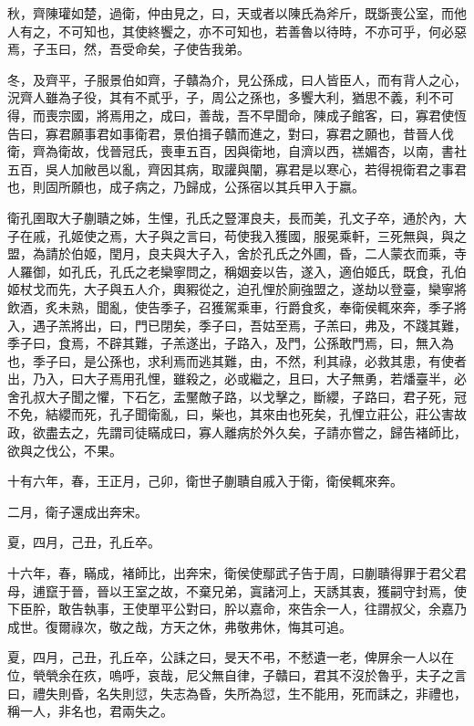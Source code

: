 \begin{pinyinscope}
秋，齊陳瓘如楚，過衛，仲由見之，曰，天或者以陳氏為斧斤，既斲喪公室，而他人有之，不可知也，其使終饗之，亦不可知也，若善魯以待時，不亦可乎，何必惡焉，子玉曰，然，吾受命矣，子使告我弟。

冬，及齊平，子服景伯如齊，子贛為介，見公孫成，曰人皆臣人，而有背人之心，況齊人雖為子役，其有不貳乎，子，周公之孫也，多饗大利，猶思不義，利不可得，而喪宗國，將焉用之，成曰，善哉，吾不早聞命，陳成子館客，曰，寡君使恆告曰，寡君願事君如事衛君，景伯揖子贛而進之，對曰，寡君之願也，昔晉人伐衛，齊為衛故，伐晉冠氏，喪車五百，因與衛地，自濟以西，禚媚杏，以南，書社五百，吳人加敝邑以亂，齊因其病，取讙與闡，寡君是以寒心，若得視衛君之事君也，則固所願也，成子病之，乃歸成，公孫宿以其兵甲入于嬴。

衛孔圉取大子蒯聵之姊，生悝，孔氏之豎渾良夫，長而美，孔文子卒，通於內，大子在戚，孔姬使之焉，大子與之言曰，苟使我入獲國，服冕乘軒，三死無與，與之盟，為請於伯姬，閏月，良夫與大子入，舍於孔氏之外圃，昏，二人蒙衣而乘，寺人羅御，如孔氏，孔氏之老欒寧問之，稱姻妾以告，遂入，適伯姬氏，既食，孔伯姬杖戈而先，大子與五人介，輿豭從之，迫孔悝於廁強盟之，遂劫以登臺，欒寧將飲酒，炙未熟，聞亂，使告季子，召獲駕乘車，行爵食炙，奉衛侯輒來奔，季子將入，遇子羔將出，曰，門已閉矣，季子曰，吾姑至焉，子羔曰，弗及，不踐其難，季子曰，食焉，不辟其難，子羔遂出，子路入，及門，公孫敢門焉，曰，無入為也，季子曰，是公孫也，求利焉而逃其難，由，不然，利其祿，必救其患，有使者出，乃入，曰大子焉用孔悝，雖殺之，必或繼之，且曰，大子無勇，若燔臺半，必舍孔叔大子聞之懼，下石乞，盂黶敵子路，以戈擊之，斷纓，子路曰，君子死，冠不免，結纓而死，孔子聞衛亂，曰，柴也，其來由也死矣，孔悝立莊公，莊公害故政，欲盡去之，先謂司徒瞞成曰，寡人離病於外久矣，子請亦嘗之，歸告褚師比，欲與之伐公，不果。

十有六年，春，王正月，己卯，衛世子蒯聵自戚入于衛，衛侯輒來奔。

二月，衛子還成出奔宋。

夏，四月，己丑，孔丘卒。

十六年，春，瞞成，褚師比，出奔宋，衛侯使鄢武子告于周，曰蒯聵得罪于君父君母，逋竄于晉，晉以王室之故，不棄兄弟，寘諸河上，天誘其衷，獲嗣守封焉，使下臣肸，敢告執事，王使單平公對曰，肸以嘉命，來告余一人，往謂叔父，余嘉乃成世。復爾祿次，敬之哉，方天之休，弗敬弗休，悔其可追。

夏，四月，己丑，孔丘卒，公誄之曰，旻天不弔，不憖遺一老，俾屏余一人以在位，煢煢余在疚，嗚呼，哀哉，尼父無自律，子贛曰，君其不沒於魯乎，夫子之言曰，禮失則昏，名失則愆，失志為昏，失所為愆，生不能用，死而誄之，非禮也，稱一人，非名也，君兩失之。


\end{pinyinscope}
